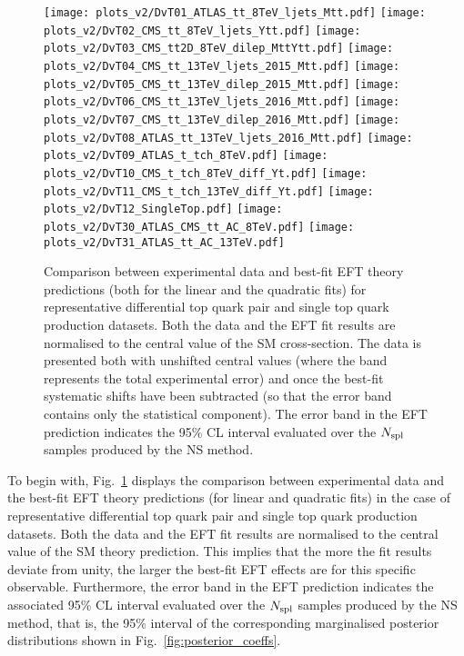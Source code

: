 \begin{figure}[htbp]
  \begin{center}
    \texttt{[image: plots\_v2/DvT01\_ATLAS\_tt\_8TeV\_ljets\_Mtt.pdf]}
    \texttt{[image: plots\_v2/DvT02\_CMS\_tt\_8TeV\_ljets\_Ytt.pdf]}
    \texttt{[image: plots\_v2/DvT03\_CMS\_tt2D\_8TeV\_dilep\_MttYtt.pdf]}
    \texttt{[image: plots\_v2/DvT04\_CMS\_tt\_13TeV\_ljets\_2015\_Mtt.pdf]}
    \texttt{[image: plots\_v2/DvT05\_CMS\_tt\_13TeV\_dilep\_2015\_Mtt.pdf]}
    \texttt{[image: plots\_v2/DvT06\_CMS\_tt\_13TeV\_ljets\_2016\_Mtt.pdf]}
    \texttt{[image: plots\_v2/DvT07\_CMS\_tt\_13TeV\_dilep\_2016\_Mtt.pdf]}
    \texttt{[image: plots\_v2/DvT08\_ATLAS\_tt\_13TeV\_ljets\_2016\_Mtt.pdf]}
    \texttt{[image: plots\_v2/DvT09\_ATLAS\_t\_tch\_8TeV.pdf]}
    \texttt{[image: plots\_v2/DvT10\_CMS\_t\_tch\_8TeV\_diff\_Yt.pdf]}
    \texttt{[image: plots\_v2/DvT11\_CMS\_t\_tch\_13TeV\_diff\_Yt.pdf]}
    \texttt{[image: plots\_v2/DvT12\_SingleTop.pdf]}
    \texttt{[image: plots\_v2/DvT30\_ATLAS\_CMS\_tt\_AC\_8TeV.pdf]}
    \texttt{[image: plots\_v2/DvT31\_ATLAS\_tt\_AC\_13TeV.pdf]}
    \caption{\small Comparison between experimental data and best-fit EFT theory
      predictions (both for the linear and the quadratic fits)
      for representative differential top quark pair
      and single top quark production datasets.
      Both the data and the EFT fit results are normalised to the central value of the SM cross-section.
      The data is presented both with unshifted central values
      (where the band represents the total experimental error) and once
      the best-fit systematic shifts have been subtracted (so that the error band
      contains only the statistical component).
      The error band in the EFT prediction indicates the 95\% CL interval evaluated
      over the $N_{\rm spl}$ samples produced by the NS method.
     \label{fig:data_vs_theory_top_diff} }
  \end{center}
\end{figure}

To begin with, Fig.~\ref{fig:data_vs_theory_top_diff} displays
the comparison between experimental data and the best-fit EFT theory
predictions (for linear and quadratic fits)
in the case of representative differential top quark pair
and single top quark production datasets.
%
Both the data and the EFT fit results are normalised to the central value of the SM theory prediction.
%
This implies that the more the fit results deviate from unity, the larger the best-fit EFT effects
are for this specific observable.
%
Furthermore, the error band in the EFT prediction indicates the associated 95\% CL interval evaluated
over the $N_{\rm spl}$ samples produced by the NS method, {  that is, the 95\% interval
of the corresponding marginalised posterior distributions shown in Fig.~\ref{fig:posterior_coeffs}.}

